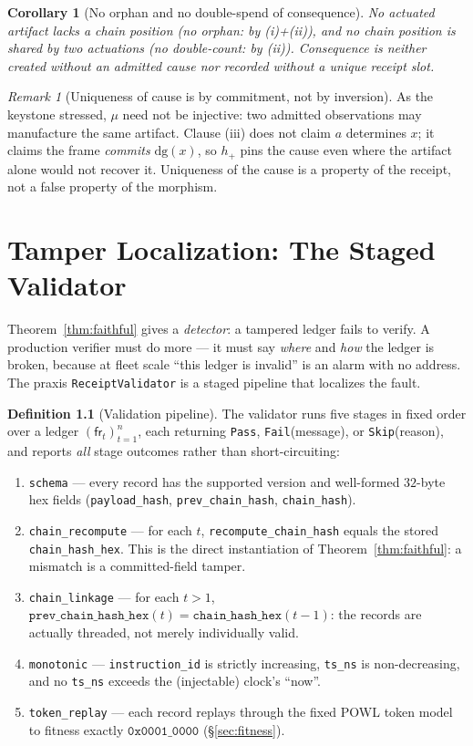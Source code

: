 \documentclass[11pt,oneside]{book}
\theoremstyle{definition}
\newtheorem{definition}{Definition}[chapter]
\theoremstyle{plain}
\newtheorem{corollary}[theorem]{Corollary}
\theoremstyle{remark}
\newtheorem*{remark}{Remark}
\newcommand{\muop}{\mu}                        %
\newcommand{\dg}{\mathrm{dg}}                   %
\newcommand{\fr}{\mathsf{fr}}                   %
\newcommand{\code}[1]{\texttt{#1}}
\begin{document}
\begin{corollary}[No orphan and no double-spend of consequence]\label{cor:orphan}
No actuated artifact lacks a chain position (\emph{no orphan}: by (i)+(ii)), and no chain
position is shared by two actuations (\emph{no double-count}: by (ii)). Consequence is
neither created without an admitted cause nor recorded without a unique receipt slot.
\end{corollary}

\begin{remark}[Uniqueness of cause is by commitment, not by inversion]
As the keystone stressed, $\muop$ need not be injective: two admitted observations may
manufacture the same artifact. Clause (iii) does not claim $a$ determines $x$; it claims the
frame \emph{commits} $\dg(x)$, so $h_{+}$ pins the cause even where the artifact alone would
not recover it. Uniqueness of the cause is a property of the receipt, not a false property of
the morphism.
\end{remark}

\chapter{Tamper Localization: The Staged Validator}
\label{ch:localize}

Theorem~\ref{thm:faithful} gives a \emph{detector}: a tampered ledger fails to verify. A
production verifier must do more --- it must say \emph{where} and \emph{how} the ledger is
broken, because at fleet scale ``this ledger is invalid'' is an alarm with no address. The
praxis \code{ReceiptValidator} is a staged pipeline that localizes the fault.

\begin{definition}[Validation pipeline]\label{def:pipeline}
The validator runs five stages in fixed order over a ledger $(\fr_t)_{t=1}^{n}$, each returning
\code{Pass}, \code{Fail}(message), or \code{Skip}(reason), and reports \emph{all} stage
outcomes rather than short-circuiting:
\begin{enumerate}[label=(S\arabic*),leftmargin=*]
\item \code{schema} --- every record has the supported version and well-formed
$32$-byte hex fields (\code{payload\_hash}, \code{prev\_chain\_hash}, \code{chain\_hash}).
\item \code{chain\_recompute} --- for each $t$, \code{recompute\_chain\_hash} equals the stored
\code{chain\_hash\_hex}. This is the direct instantiation of Theorem~\ref{thm:faithful}: a
mismatch is a committed-field tamper.
\item \code{chain\_linkage} --- for each $t>1$, $\code{prev\_chain\_hash\_hex}(t)=
\code{chain\_hash\_hex}(t-1)$: the records are actually threaded, not merely individually
valid.
\item \code{monotonic} --- \code{instruction\_id} is strictly increasing, \code{ts\_ns} is
non-decreasing, and no \code{ts\_ns} exceeds the (injectable) clock's ``now''.
\item \code{token\_replay} --- each record replays through the fixed POWL token model to
fitness exactly $\code{0x0001\_0000}$ (\S\ref{sec:fitness}).
\end{enumerate}
\end{definition}
\end{document}
